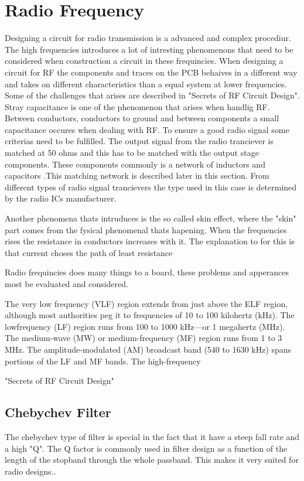 \section{Radio Frequency}
Designing a circuit for radio transmission is a advanced and complex procediur. The high frequencies introduces a lot of intresting phenomenons that need to be considered when construction a circuit in these frequincies. When designing a circuit for RF the components and traces on the PCB behaives in a different way and takes on different characteristics than a equal system at lower frequencies. Some of the challenges that arises are described in "Secrets of RF Circuit Design". Stray capacitance is one of the phenomenon that arises when handlig RF. Between conductors, conductors to ground and between components a small capacitance occures when dealing with RF. To ensure a good radio signal  some criterias need to be fulfilled. 
The output signal from the radio tranciever is matched at 50 ohms and this has to be matched with the output stage components. These components commonly is a network of inductors and capacitors .This matching network is described later in this section. 
From different types of radio signal trancievers the type used in this case is determined by the radio ICs manufacturer. %


Another phenomena thats intruduces is the so called skin effect, where the "skin" part comes from the fysical phenomenal thats hapening. When the frequencies rises the resistance in conductors increases with it. The explanation to for this is that current choses the path of least resistance


Radio frequincies does many things to a board, these problems and apperances most be evaluated and considered.  

The very low frequency (VLF) region extends from just above the ELF region,
although most authorities peg it to frequencies of 10 to 100 kilohertz (kHz). The lowfrequency
(LF) region runs from 100 to 1000 kHz—or 1 megahertz (MHz). The
medium-wave (MW) or medium-frequency (MF) region runs from 1 to 3 MHz. The
amplitude-modulated (AM) broadcast band (540 to 1630 kHz) spans portions of the
LF and MF bands.
The high-frequency

"Secrets of RF Circuit Design"
 
\subsection{Chebychev Filter}
The chebychev type of filter is special in the fact that it have a steep fall rate and a high "Q". The Q factor is commonly used in filter design as a function of the length of the stopband through the whole passband.
This makes it very suited for radio designs.. 



